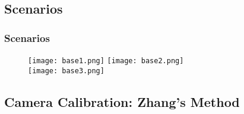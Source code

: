 \documentclass{beamer}
\begin{document}
	\subsection{Scenarios}

		\begin{frame}\frametitle{Scenarios}
			\begin{figure}[htb!]
				\centering
				\texttt{[image: base1.png]}
				\texttt{[image: base2.png]}\\
				\texttt{[image: base3.png]}
				\label{fig:scenarios1}
			\end{figure}

		\end{frame}


\subsection{Camera Calibration: Zhang's Method}


\end{document}
